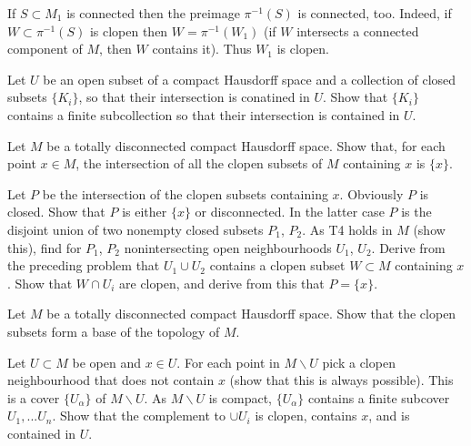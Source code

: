 \documentclass[12pt]{article}
\begin{document}
\begin{ukazanie}
If $S\subset M_1$ is connected then the preimage
$\pi^{-1}(S)$ is connected, too. Indeed, if
$W\subset \pi^{-1}(S)$ is clopen then 
$W= \pi^{-1}(W_1)$ (if $W$ intersects a connected component of 
$M$, then $W$ contains it). Thus $W_1$ is clopen.
\end{ukazanie}

\begin{zadacha} 
Let $U$ be an open subset of a compact Hausdorff space
and a collection of closed subsets
$\{K_i\}$, so that their intersection is conatined in $U$.
Show that $\{K_i\}$ contains a finite subcollection
so that their intersection is contained in $U$.
\end{zadacha}

\begin{zadacha}[*] 
Let $M$ be a totally disconnected compact Hausdorff space.
Show that, for each point $x\in M$, the intersection of all the
clopen subsets of $M$ containing $x$ is $\{x\}$.
\end{zadacha}

\begin{ukazanie}
Let $P$ be the intersection of the clopen subsets containing $x$.
Obviously $P$ is closed. Show that $P$ is either $\{x\}$ or disconnected.
In the latter case $P$ is the disjoint union of two nonempty 
closed subsets $P_1$, $P_2$. As T4 holds in $M$ (show this),
find for 
$P_1$, $P_2$ nonintersecting open neighbourhoods $U_1$, $U_2$.
Derive from the preceding problem that $U_1 \cup U_2$ contains
a clopen subset $W\subset M$ containing $x$.
Show that $W\cap U_i$ are clopen, and derive from this 
that $P=\{x\}$.
\end{ukazanie}

\begin{zadacha}[*]
Let $M$ be a totally disconnected compact Hausdorff space.
Show that the clopen subsets form a base of the topology of $M$.
\end{zadacha}


\begin{ukazanie}
Let $U\subset M$ be open and 
$x\in U$. 
For each point in  $M\backslash U$ pick a clopen neighbourhood that
does not contain $x$ (show that this is always possible).
This is a cover $\{U_\alpha\}$ of
$M\backslash U$. As $M\backslash U$ is compact,
$\{U_\alpha\}$ contains a finite subcover $U_1, ... U_n$. 
Show that the complement to 
$\cup U_i$ is clopen, contains $x$, and is contained in $U$.
\end{ukazanie}
\end{document}
